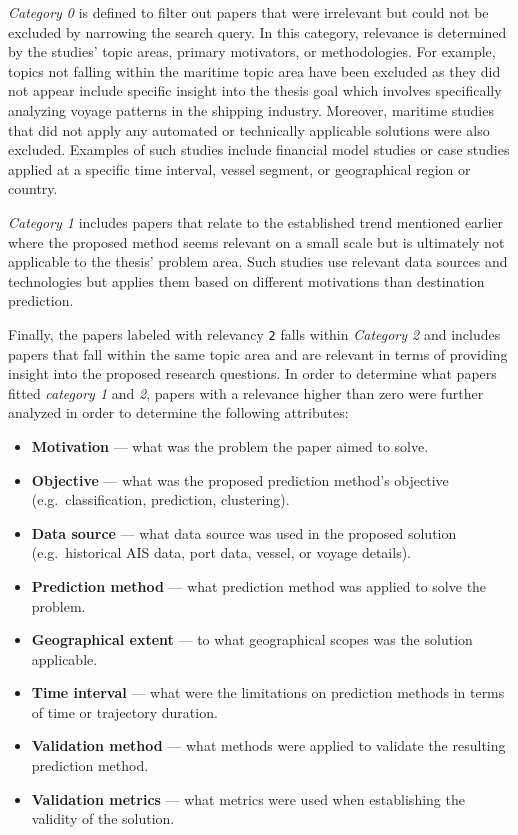 \textit{Category 0} is defined to filter out papers that were irrelevant but could not be excluded by narrowing the search query. In this category, relevance is determined by the studies' topic areas, primary motivators, or methodologies. For example, topics not falling within the maritime topic area have been excluded as they did not appear include specific insight into the thesis goal which involves specifically analyzing voyage patterns in the shipping industry. Moreover, maritime studies that did not apply any automated or technically applicable solutions were also excluded. Examples of such studies include financial model studies or case studies applied at a specific time interval, vessel segment, or geographical region or country.

\textit{Category 1} includes papers that relate to the established trend mentioned earlier where the proposed method seems relevant on a small scale but is ultimately not applicable to the thesis' problem area. Such studies use relevant data sources and technologies but applies them based on different motivations than destination prediction.

Finally, the papers labeled with relevancy \texttt{2} falls within \textit{Category 2} and includes papers that fall within the same topic area and are relevant in terms of providing insight into the proposed research questions. In order to determine what papers fitted \textit{category 1} and \textit{2}, papers with a relevance higher than zero were further analyzed in order to determine the following attributes:

\begin{itemize}
    \item \textbf{Motivation} --- what was the problem the paper aimed to solve.
    \item \textbf{Objective} --- what was the proposed prediction method's objective (e.g.\ classification, prediction, clustering).
    \item \textbf{Data source} --- what data source was used in the proposed solution (e.g.\ historical AIS data, port data, vessel, or voyage details).
    \item \textbf{Prediction method} --- what prediction method was applied to solve the problem.
    \item \textbf{Geographical extent} --- to what geographical scopes was the solution applicable.
    \item \textbf{Time interval} --- what were the limitations on prediction methods in terms of time or trajectory duration.
    \item \textbf{Validation method} --- what methods were applied to validate the resulting prediction method.
    \item \textbf{Validation metrics} --- what metrics were used when establishing the validity of the solution.
\end{itemize}

